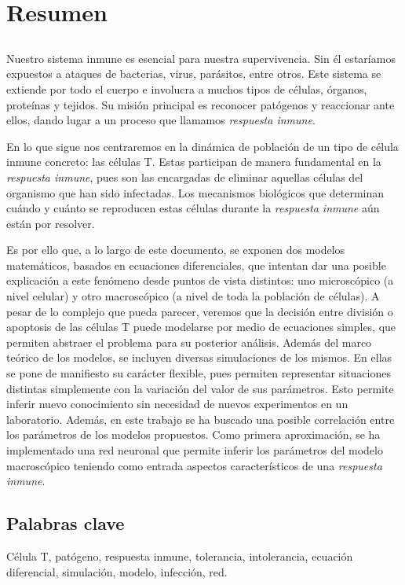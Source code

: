 \chapter*{Resumen}


\section*{}

Nuestro sistema inmune es esencial para nuestra supervivencia. Sin él estaríamos expuestos a ataques de bacterias, virus, parásitos, entre otros. Este sistema se extiende por todo el cuerpo e involucra a muchos tipos de células, órganos, proteínas y tejidos. Su misión principal es reconocer patógenos y reaccionar ante ellos, dando lugar a un proceso que llamamos \textit{respuesta inmune}. 

En lo que sigue nos centraremos en la dinámica de población de un tipo de célula inmune concreto: las células T. Estas participan de manera fundamental en la \textit{respuesta inmune}, pues son las encargadas de eliminar aquellas células del organismo que han sido infectadas. Los mecanismos biológicos que determinan cuándo y cuánto se reproducen estas células durante la \textit{respuesta inmune} aún están por resolver. 

Es por ello que, a lo largo de este documento, se exponen dos modelos matemáticos, basados en ecuaciones diferenciales, que intentan dar una posible explicación a este fenómeno desde puntos de vista distintos: uno microscópico (a nivel celular) y otro macroscópico (a nivel de toda la población de células). A pesar de lo complejo que pueda parecer, veremos que la decisión entre división o apoptosis de las células T puede modelarse por medio de ecuaciones simples, que permiten abstraer el problema para su posterior análisis. Además del marco teórico de los modelos, se incluyen diversas simulaciones de los mismos. En ellas se pone de manifiesto su carácter flexible, pues permiten representar situaciones distintas simplemente con la variación del valor de sus parámetros. Esto permite inferir nuevo conocimiento sin necesidad de nuevos experimentos en un laboratorio. Además, en este trabajo se ha buscado una posible correlación entre los parámetros de los modelos propuestos. Como primera aproximación, se ha implementado una red neuronal que permite inferir los parámetros del modelo macroscópico teniendo como entrada aspectos característicos de una \textit{respuesta inmune}.



\section*{Palabras clave}
   

\noindent Célula T, patógeno, respuesta inmune, tolerancia, intolerancia, ecuación diferencial, simulación, modelo, infección, red.

   


